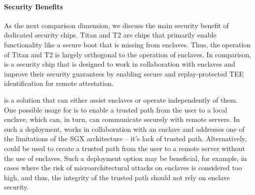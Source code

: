 \paragraph{Security Benefits}
As the next comparison dimension, we discuss the main security benefit of dedicated security chips. Titan and T2 are chips that primarily enable functionality like a secure boot that is missing from enclaves. Thus, the operation of Titan and T2 is largely orthogonal to the operation of enclaves. 
%
In comparison, \proximitee is a security chip that is designed to work in collaboration with enclaves and improve their security guarantees by enabling secure and replay-protected TEE identification for remote attestation. 

\protection is a solution that can either assist enclaves or operate independently of them. One possible usage for \protection is to enable a trusted path from the user to a local enclave, which can, in turn, can communicate securely with remote servers. In such a deployment, \protection works in collaboration with an enclave and addresses one of the limitations of the SGX architecture -- it’s lack of trusted path. Alternatively, \protection could be used to create a trusted path from the user to a remote server without the use of enclaves. Such a deployment option may be beneficial, for example, in cases where the risk of microarchitectural attacks on enclaves is considered too high, and thus, the integrity of the trusted path should not rely on enclave security.


